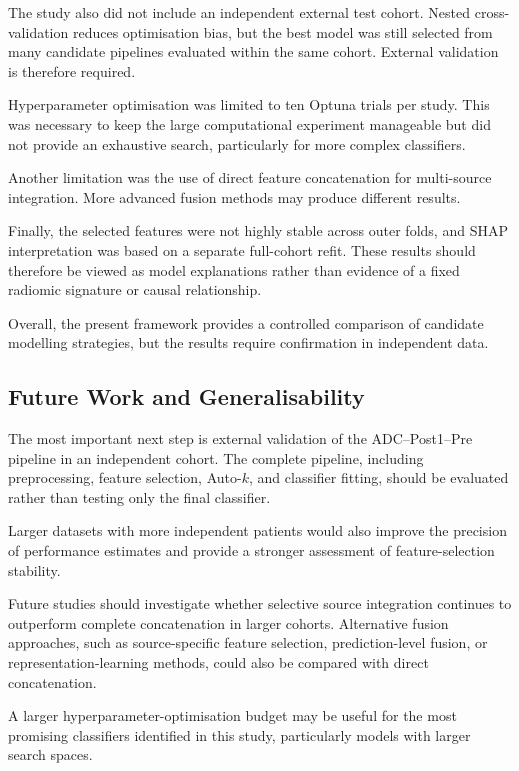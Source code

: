 \documentclass[12pt,twocolumn]{article}
\begin{document}
The study also did not include an independent external test cohort.
Nested cross-validation reduces optimisation bias, but the best model
was still selected from many candidate pipelines evaluated within the
same cohort. External validation is therefore required.

Hyperparameter optimisation was limited to ten Optuna trials per study.
This was necessary to keep the large computational experiment
manageable but did not provide an exhaustive search, particularly for
more complex classifiers.

Another limitation was the use of direct feature concatenation for
multi-source integration. More advanced fusion methods may produce
different results.

Finally, the selected features were not highly stable across outer
folds, and SHAP interpretation was based on a separate full-cohort
refit. These results should therefore be viewed as model explanations
rather than evidence of a fixed radiomic signature or causal
relationship.

Overall, the present framework provides a controlled comparison of
candidate modelling strategies, but the results require confirmation
in independent data.


\subsection{Future Work and Generalisability}
\label{subsec:discussion_future_work}

The most important next step is external validation of the
ADC--Post1--Pre pipeline in an independent cohort. The complete
pipeline, including preprocessing, feature selection, Auto-\(k\), and
classifier fitting, should be evaluated rather than testing only the
final classifier.

Larger datasets with more independent patients would also improve the
precision of performance estimates and provide a stronger assessment
of feature-selection stability.

Future studies should investigate whether selective source integration
continues to outperform complete concatenation in larger cohorts.
Alternative fusion approaches, such as source-specific feature
selection, prediction-level fusion, or representation-learning
methods, could also be compared with direct concatenation.

A larger hyperparameter-optimisation budget may be useful for the most
promising classifiers identified in this study, particularly models
with larger search spaces.
\end{document}

